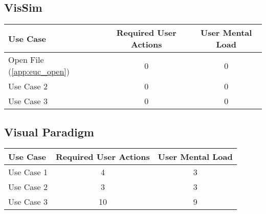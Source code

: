 \subsection*{VisSim}

\begin{tabularx}{\textwidth}{Xcc}
\textbf{Use Case} & \textbf{Required User Actions} & \textbf{User Mental Load}\\
\hline
Open File (\ref{app:euc_open}) & {\color{red}0} & {\color{red}0} \\
Use Case 2                     & {\color{red}0} & {\color{red}0} \\
Use Case 3                     & {\color{red}0} & {\color{red}0}
\end{tabularx}

\subsection*{Visual Paradigm}




\begin{tabularx}{\textwidth}{Xcc}
\textbf{Use Case} & \textbf{Required User Actions} & \textbf{User Mental Load}\\
\hline
Use Case 1                          & 4 & 3 \\
Use Case 2                          & 3 & 3 \\
Use Case 3                          & 10 & 9
\end{tabularx}

